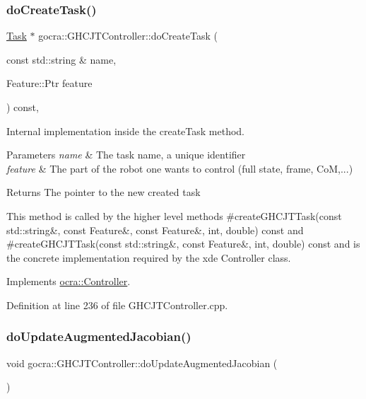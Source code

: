 \subsubsection{\texorpdfstring{do\+Create\+Task()}{doCreateTask()}\hspace{0.1cm}{\footnotesize\ttfamily [2/2]}}
{\footnotesize\ttfamily \hyperlink{classocra_1_1Task}{Task} $\ast$ gocra\+::\+G\+H\+C\+J\+T\+Controller\+::do\+Create\+Task (\begin{DoxyParamCaption}\item[{const std\+::string \&}]{name,  }\item[{Feature\+::\+Ptr}]{feature }\end{DoxyParamCaption}) const\hspace{0.3cm}{\ttfamily [protected]}, {\ttfamily [virtual]}}

Internal implementation inside the create\+Task method.


\begin{DoxyParams}{Parameters}
{\em name} & The task name, a unique identifier \\
\hline
{\em feature} & The part of the robot one wants to control (full state, frame, CoM,...) \\
\hline
\end{DoxyParams}
\begin{DoxyReturn}{Returns}
The pointer to the new created task
\end{DoxyReturn}
This method is called by the higher level methods \#create\+G\+H\+C\+J\+T\+Task(const std\+::string\&, const Feature\&, const Feature\&, int, double) const and \#create\+G\+H\+C\+J\+T\+Task(const std\+::string\&, const Feature\&, int, double) const and is the concrete implementation required by the xde Controller class. 

Implements \hyperlink{classocra_1_1Controller_a358a31c0b6b6bdcc0e6da5c49eb9fde5}{ocra\+::\+Controller}.



Definition at line 236 of file G\+H\+C\+J\+T\+Controller.\+cpp.

\hypertarget{classgocra_1_1GHCJTController_ad15bf75052d51753ba0454e040dac8dc}{}\label{classgocra_1_1GHCJTController_ad15bf75052d51753ba0454e040dac8dc} 
\subsubsection{\texorpdfstring{do\+Update\+Augmented\+Jacobian()}{doUpdateAugmentedJacobian()}}
{\footnotesize\ttfamily void gocra\+::\+G\+H\+C\+J\+T\+Controller\+::do\+Update\+Augmented\+Jacobian (\begin{DoxyParamCaption}{ }\end{DoxyParamCaption})}



